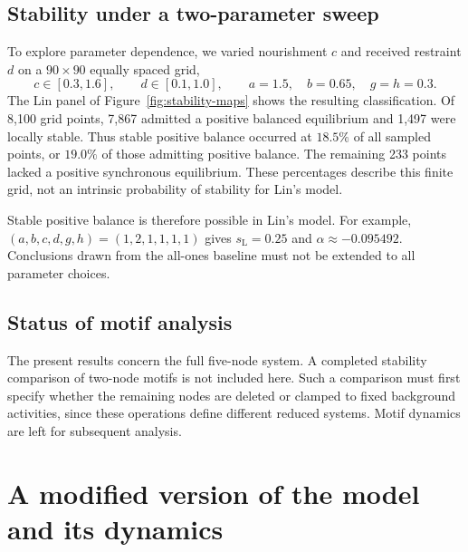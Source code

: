\documentclass{article}
\begin{document}
\subsection{Stability under a two-parameter sweep}
To explore parameter dependence, we varied nourishment $c$ and received
restraint $d$ on a $90\times90$ equally spaced grid,
\begin{equation}
 c\in[0.3,1.6],\qquad d\in[0.1,1.0],\qquad
 a=1.5,\quad b=0.65,\quad g=h=0.3.
 \label{eq:lin-sweep}
\end{equation}
The Lin panel of Figure~\ref{fig:stability-maps} shows the resulting
classification. Of 8,100 grid points, 7,867 admitted a positive balanced
equilibrium and 1,497 were locally stable. Thus stable positive balance
occurred at $18.5\%$ of all sampled points, or $19.0\%$ of those admitting
positive balance. The remaining 233 points lacked a positive synchronous
equilibrium. These percentages describe this finite grid, not an intrinsic
probability of stability for Lin's model.

Stable positive balance is therefore possible in Lin's model. For example,
$(a,b,c,d,g,h)=(1,2,1,1,1,1)$ gives $s_{\mathrm L}=0.25$ and
$\alpha\approx-0.095492$. Conclusions drawn from the all-ones baseline
must not be extended to all parameter choices.

\subsection{Status of motif analysis}
The present results concern the full five-node system. A completed stability
comparison of two-node motifs is not included here. Such a comparison must
first specify whether the remaining nodes are deleted or clamped to fixed
background activities, since these operations define different reduced
systems. Motif dynamics are left for subsequent analysis.

\section{A modified version of the model and its dynamics}
\label{sec:modified-results}
\end{document}
